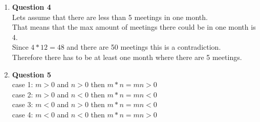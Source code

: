 \documentclass[12pt]{article}
\begin{document}
\begin{enumerate}
\item {\bf Question 4} \\
Lets assume that there are less than 5 meetings in one month. \\
That means that the max amount of meetings there could be in one month is 4. \\
Since $4* 12 = 48$ and there are 50 meetings this is a contradiction. \\
Therefore there has to be at least one month where there are 5 meetings. \\ 
\item {\bf{Question 5}} \\
case 1: $m > 0$ and $n > 0$ then $m * n = mn > 0$ \\
case 2: $m > 0$ and $n < 0$ then $m * n = mn < 0$ \\
case 3: $m < 0$ and $n > 0$ then $m * n = mn < 0$ \\
case 4: $m < 0$ and $n < 0$ then $m * n = mn > 0$ \\


\end{enumerate}
\end{document}
